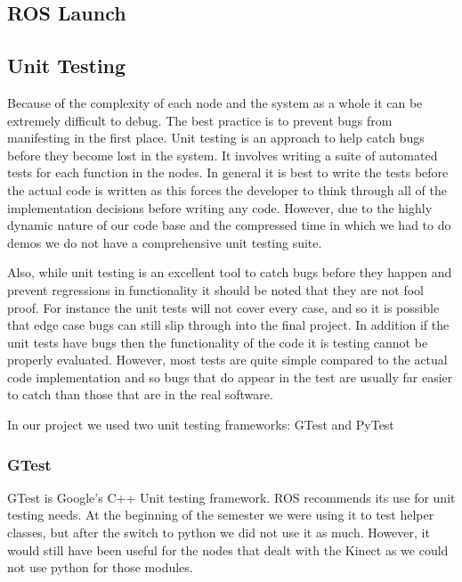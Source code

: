 \subsection{ROS Launch}



\subsection{Unit Testing}

Because of the complexity of each node and the system as a whole it can be extremely difficult to debug. The best practice is to prevent bugs from manifesting in the first place. Unit testing is an approach to help catch bugs before they become lost in the system. It involves writing a suite of automated tests for each function in the nodes. In general it is best to write the tests before the actual code is written as this forces the developer to think through all of the implementation decisions before writing any code. However, due to the highly dynamic nature of our code base and the compressed time in which we had to do demos we do not have a comprehensive unit testing suite.

Also, while unit testing is an excellent tool to catch bugs before they happen and prevent regressions in functionality it should be noted that they are not fool proof.  For instance the unit tests will not cover every case, and so it is possible that edge case bugs can still slip through into the final project. In addition if the unit tests have bugs then the functionality of the code it is testing cannot be properly evaluated. However, most tests are quite simple compared to the actual code implementation and so bugs that do appear in the test are usually far easier to catch than those that are in the real software.

In our project we used two unit testing frameworks: GTest and PyTest

\subsubsection{GTest}

GTest is Google's C++ Unit testing
framework.\cite{google_googletest} ROS recommends
its use for unit testing needs. At the beginning of the semester we were using it to test 
helper classes, but after the switch to python we did not use it as much. However, it would still have been useful for the nodes that dealt with the Kinect as we could not use python for those modules.

